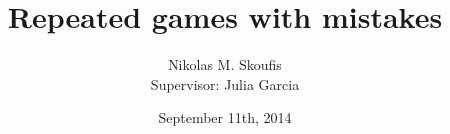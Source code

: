 \documentclass[a4paper,11pt]{article}
\begin{document}
\title{Repeated games with mistakes}
\author{Nikolas M. Skoufis \\ Supervisor: Julia Garcia}
\date{September 11th, 2014}

\maketitle
\end{document}
